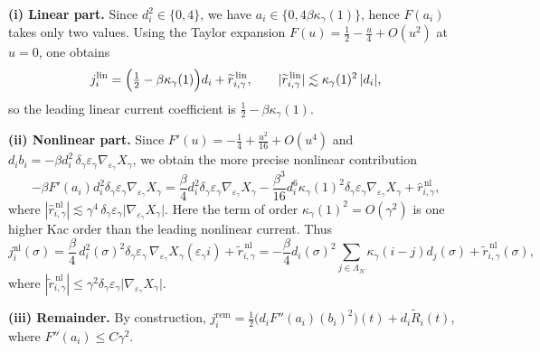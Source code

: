 \documentclass{article}
\begin{document}
\medskip
\noindent\textbf{(i) Linear part.}
Since \(d_i^2\in\{0,4\}\), we have \(a_i\in\{0,4\beta \kappa_\gamma(1)\}\), hence \(F(a_i)\) takes only two values.
Using the Taylor expansion \(F(u)=\frac12-\frac{u}{4}+O(u^2)\) at \(u=0\), one obtains
\[
j_i^{\mathrm{lin}}
=
\Bigl(\tfrac12-\beta\kappa_\gamma(1)\Bigr)d_i
+\widetilde r_{i,\gamma}^{\,\mathrm{lin}},
\qquad
|\widetilde r_{i,\gamma}^{\,\mathrm{lin}}|\lesssim \kappa_\gamma(1)^2\,|d_i|,
\]
so the leading linear current coefficient is \(\tfrac12-\beta\kappa_\gamma(1)\).

\medskip
\noindent\textbf{(ii) Nonlinear part.}
Since
\(
F'(u)
=
-\frac14+\frac{u^2}{16}+O(u^4)
\)
and \(d_i b_i=-\beta d_i^2\,\delta_\gamma\varepsilon_\gamma\nabla_{\varepsilon_\gamma}X_\gamma\),
we obtain the more precise nonlinear contribution
\[
-\beta F'(a_i)d_i^2\delta_\gamma\varepsilon_\gamma
\nabla_{\varepsilon_\gamma}X_\gamma
=
\frac{\beta}{4}d_i^2\delta_\gamma\varepsilon_\gamma
\nabla_{\varepsilon_\gamma}X_\gamma
-
\frac{\beta^3}{16}d_i^6\kappa_\gamma(1)^2
\delta_\gamma\varepsilon_\gamma
\nabla_{\varepsilon_\gamma}X_\gamma
+
\widehat r_{i,\gamma}^{\,\mathrm{nl}},
\]
where
\(
|\widehat r_{i,\gamma}^{\,\mathrm{nl}}|
\lesssim
\gamma^4\,
\delta_\gamma\varepsilon_\gamma
\bigl|\nabla_{\varepsilon_\gamma}X_\gamma\bigr|.
\)
Here the term of order \(\kappa_\gamma(1)^2 = O(\gamma^2)\) is one higher Kac order than the
leading nonlinear current.  Thus
\[
j_i^{\mathrm{nl}}(\sigma) = \frac{\beta}{4}\,d_i^2(\sigma)^2\delta_\gamma\varepsilon_\gamma\,\nabla_{\varepsilon_\gamma}X_\gamma(\varepsilon_\gamma i)
+\widetilde r_{i,\gamma}^{\,\mathrm{nl}} 
=
-\frac{\beta}{4}
d_i(\sigma)^2
\sum_{j\in\Lambda_N}\kappa_\gamma(i-j)d_j(\sigma)
+
\widetilde r_{i,\gamma}^{\,\mathrm{nl}}(\sigma),
\]
where $|\widetilde r_{i,\gamma}^{\,\mathrm{nl}}| \le \gamma^2\delta_\gamma\varepsilon_\gamma
\bigl|\nabla_{\varepsilon_\gamma}X_\gamma\bigr|$.

\medskip
\noindent
\textbf{(iii) Remainder.}
By construction,
\(
j_i^{\mathrm{rem}}= \frac12\big(d_iF''(a_i)(b_i)^2\big)(t) + d_i \widetilde R_i(t) \), where $F''(a_i) \le C \gamma^2$.
\end{document}
